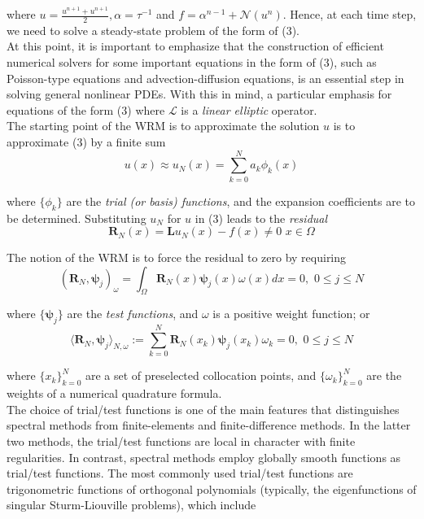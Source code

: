 where $ u = \frac{u^{ n+1 } + u^{ n+1 }}{2} , \alpha = \tau^{-1} $ and $ f = \alpha^{ n-1 } + \mathcal{N}\left( u^{ n } \right) $. Hence, at each time step, we need to solve a steady-state problem of the form of (3). \\
\indent At this point, it is important to emphasize that the construction of efficient numerical solvers for some important equations in the form of (3), such as Poisson-type equations and advection-diffusion equations, is an essential step in solving general nonlinear PDEs. With this in mind, a particular emphasis for equations of the form (3) where $ \mathcal{L} $ is a \textit{linear elliptic} operator. \\
\indent The starting point of the WRM is to approximate the solution $ u $ is to approximate (3) by a finite sum
\begin{equation}
	u(x) \approx u_N (x) = \sum_{ k=0 }^{ N } a_{ k } \phi_{ k } (x)
\end{equation}

where $ \{ \phi_{ k } \} $ are the \textit{trial (or basis) functions}, and the expansion coefficients are to be determined. Substituting $ u_{ N } $ for $ u $ in (3) leads to the \textit{residual}
\begin{equation}
	\mathbf{R}_{ N }(x) = \mathbf{L}u_{ N }(x) - f(x) \neq 0 \hspace{4pt} x \in \Omega
\end{equation}

The notion of the WRM is to force the residual to zero by requiring
\begin{equation}
	\left( \mathbf{R}_{ N }, \mathbf{\psi}_{ j } \right)_{ \omega } = \int_{ \Omega } \mathbf{R}_{ N }(x) \mathbf{\psi}_{ j }(x) \omega (x) dx = 0, \hspace{4pt} 0 \leq j \leq N
\end{equation}

where $ \{ \mathbf{\psi}_{ j } \} $ are the \textit{test functions}, and $ \omega $ is a positive weight function; or 
\begin{equation}
	\langle \mathbf{ R }_{ N }, \mathbf{ \psi }_{ j }  \rangle_{ N, \omega } := \sum_{ k=0 }^{ N } \mathbf{ R }_{ N } (x_{ k }) \mathbf{ \psi }_{ j } (x_{ k }) \omega_{ k } = 0, \hspace{4pt} 0 \leq j \leq N
\end{equation}

where $ \{ x_{ k } \}_{ k=0 }^{ N } $ are a set of preselected collocation points, and $ \{ \omega_{ k } \}_{ k=0 }^{ N } $ are the weights of a numerical quadrature formula. \\
\indent  The choice of trial/test functions is one of the main features that distinguishes spectral methods from finite-elements and finite-difference methods. In the latter two methods, the trial/test functions are local in character with finite regularities. In contrast, spectral methods employ globally smooth functions as trial/test functions. The most commonly used trial/test functions are trigonometric functions of orthogonal polynomials (typically, the eigenfunctions of singular Sturm-Liouville problems), which include

